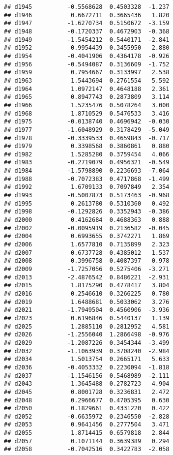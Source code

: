 \documentclass[
]{article}
\begin{document}
\begin{verbatim}
## d1945          -0.5568628  0.4503328  -1.237
## d1946           0.6672711  0.3665436   1.820
## d1947          -1.6270734  0.5150672  -3.159
## d1948          -0.1720337  0.4672903  -0.368
## d1949          -1.5454212  0.5440171  -2.841
## d1952           0.9954439  0.3455950   2.880
## d1954          -0.4041906  0.4364178  -0.926
## d1956          -0.5494087  0.3136609  -1.752
## d1959           0.7954667  0.3133997   2.538
## d1963           1.5443694  0.2761554   5.592
## d1964           1.0972147  0.4648188   2.361
## d1965           0.8947743  0.2873809   3.114
## d1966           1.5235476  0.5078264   3.000
## d1968           1.8710529  0.5476533   3.416
## d1975          -0.0138740  0.4696942  -0.030
## d1977          -1.6048929  0.3178429  -5.049
## d1978          -0.3339533  0.4659843  -0.717
## d1979           0.3398568  0.3860861   0.880
## d1982           1.5285280  0.3759454   4.066
## d1983          -0.2719079  0.4956321  -0.549
## d1984          -1.5798890  0.2236693  -7.064
## d1988          -0.7072383  0.4717868  -1.499
## d1992           1.6709133  0.7097849   2.354
## d1993          -0.5007873  0.5173463  -0.968
## d1995           0.2613780  0.5310360   0.492
## d1998          -0.1292826  0.3352943  -0.386
## d2000           0.4162684  0.4688363   0.888
## d2002          -0.0095919  0.2136582  -0.045
## d2004           0.6993655  0.3742271   1.869
## d2006           1.6577810  0.7135899   2.323
## d2007           0.6737728  0.4385012   1.537
## d2008           0.3996758  0.4087397   0.978
## d2009          -1.7257056  0.5275406  -3.271
## d2013          -2.4876542  0.8486221  -2.931
## d2015           1.8175290  0.4778417   3.804
## d2016           0.2546610  0.3266225   0.780
## d2019           1.6488681  0.5033062   3.276
## d2021          -1.7949504  0.4560906  -3.936
## d2023           0.6196846  0.5440137   1.139
## d2025           1.2885110  0.2812952   4.581
## d2026          -1.2556040  1.2866498  -0.976
## d2029          -1.2087226  0.3454344  -3.499
## d2032          -1.1063939  0.3708240  -2.984
## d2034           1.5013754  0.2665171   5.633
## d2036          -0.4053332  0.2230094  -1.818
## d2037          -1.1546156  0.5468989  -2.111
## d2043           1.3645488  0.2782723   4.904
## d2045           0.8001728  0.3236831   2.472
## d2048           0.2966677  0.4705395   0.630
## d2050           0.1829661  0.4331220   0.422
## d2052          -0.6635972  0.2346550  -2.828
## d2053           0.9641456  0.2777504   3.471
## d2055           1.8714415  0.6579818   2.844
## d2057           0.1071144  0.3639389   0.294
## d2058          -0.7042516  0.3422783  -2.058

\end{verbatim}
\end{document}
